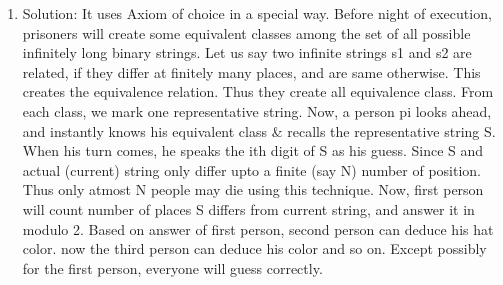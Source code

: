 \begin{enumerate}
\item
Solution: It uses Axiom of choice in a special way. Before night of execution, prisoners will create some equivalent classes among the set of all possible infinitely long binary strings. Let us say two infinite strings s1 and s2 are related, if they differ at finitely many places, and are same otherwise. This creates the equivalence relation. Thus they create all equivalence class. From each class, we mark one representative string.
Now, a person pi looks ahead, and instantly knows his equivalent class \& recalls the representative string S. When his turn comes, he speaks the ith digit of S as his guess. Since S and actual (current) string only differ upto a finite (say N) number of position. Thus only atmost N people may die using this technique.
Now, first person will count number of places S differs from current string, and answer it in modulo 2. Based on answer of first person, second person can deduce his hat color. now the third person can deduce his color and so on. Except possibly for the first person, everyone will guess correctly.



\end{enumerate}